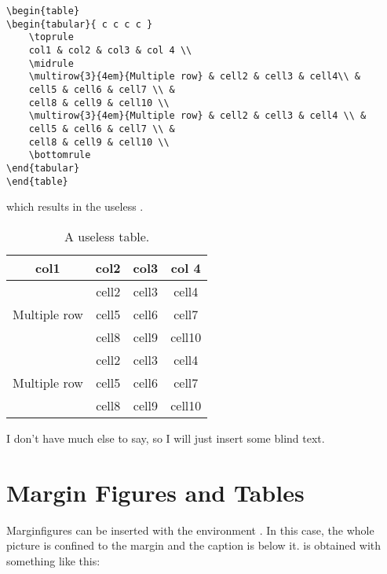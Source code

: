\begin{lstlisting}[caption={Caption of a listing.}]
\begin{table}
\begin{tabular}{ c c c c }
	\toprule
	col1 & col2 & col3 & col 4 \\
	\midrule
	\multirow{3}{4em}{Multiple row} & cell2 & cell3 & cell4\\ &
	cell5 & cell6 & cell7 \\ &
	cell8 & cell9 & cell10 \\
	\multirow{3}{4em}{Multiple row} & cell2 & cell3 & cell4 \\ &
	cell5 & cell6 & cell7 \\ &
	cell8 & cell9 & cell10 \\
	\bottomrule
\end{tabular}
\end{table}
\end{lstlisting}

which results in the useless .

\begin{table}[ht]
\caption[A useless table]{A useless table.}
\begin{tabular}{ c c c c }
	\toprule
	col1 & col2 & col3 & col 4 \\
	\midrule
	\multirow{3}{4em}{Multiple row} & cell2 & cell3 & cell4\\ &
	cell5 & cell6 & cell7 \\ &
	cell8 & cell9 & cell10 \\
	\multirow{3}{4em}{Multiple row} & cell2 & cell3 & cell4 \\ &
	cell5 & cell6 & cell7 \\ &
	cell8 & cell9 & cell10 \\
	\bottomrule
\end{tabular}
\end{table}

I don't have much else to say, so I will just insert some blind text. 
\blindtext

\section{Margin Figures and Tables}

Marginfigures can be inserted with the environment 
. In this case, the whole picture is confined 
to the margin and the caption is below it.  is 
obtained with something like this:

